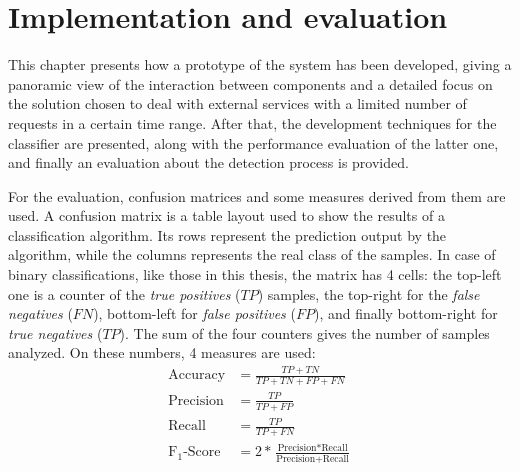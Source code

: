 \chapter{Implementation and evaluation}
\label{cha:results}
This chapter presents how a prototype of the system has been developed, giving a panoramic view of the interaction between components and a detailed focus on the solution chosen to deal with external services with a limited number of requests in a certain time range. After that, the development techniques for the classifier are presented, along with the performance evaluation of the latter one, and finally an evaluation about the detection process is provided.

For the evaluation, confusion matrices and some measures derived from them are used. A confusion matrix is a table layout used to show the results of a classification algorithm. Its rows represent the prediction output by the algorithm, while the columns represents the real class of the samples. In case of binary classifications, like those in this thesis, the matrix has 4 cells: the top-left one is a counter of the \emph{true positives} ($TP$) samples, the top-right for the \emph{false negatives} ($FN$), bottom-left for \emph{false positives} ($FP$), and finally bottom-right for \emph{true negatives} ($TP$). The sum of the four counters gives the number of samples analyzed. On these numbers, 4 measures are used:
\begin{equation*}
\begin{split}
\text{Accuracy} & = \frac{TP + TN}{TP + TN + FP + FN}\\
\text{Precision} & = \frac{TP}{TP + FP} \\ 
\text{Recall} & = \frac{TP}{TP + FN}\\
\text{F}_1\text{-Score} & = 2 * \frac{\text{Precision} * \text{Recall}}{\text{Precision} + \text{Recall}}
\end{split}
\end{equation*}


